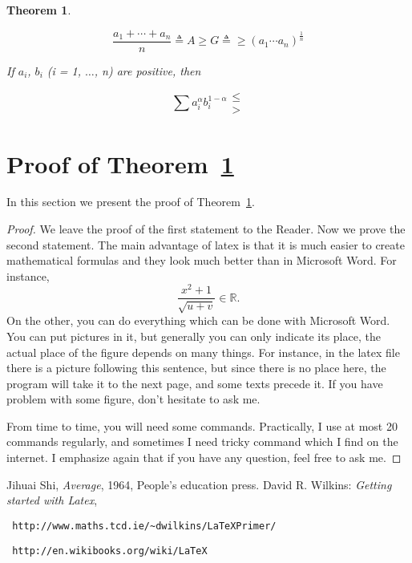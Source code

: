 \documentclass[12pt,a4paper,reqno]{amsart}
\theoremstyle{plain}
\newtheorem{Th}{Theorem}
\theoremstyle{definition}
\begin{document}
\begin{Th} \label{main} 

\begin{equation}
  \frac{a_1 + \cdots +a_n}{n} \triangleq A \geqslant G \triangleq \geqslant (a_1 \cdots a_n)^{\frac{1}{n}}
\end{equation}

If $a_i$, $b_i$  (i = 1, $\ldots$, n) are positive, then

\[
\sum a^{\alpha}_{i} b^{1-\alpha}_{i} 
                \begin{array}{ll}
                  \leqslant  \\
                  > 
                \end{array}
\]


\end{Th}

\section{Proof of Theorem~\ref{main}}

In this section we present the proof of Theorem~\ref{main}.

\begin{proof} We leave the proof of the first statement to the Reader. Now we prove the second statement. The main advantage of latex is that it is much easier to create mathematical formulas and they look much better than in Microsoft Word.
For instance,
$$\frac{x^2+1}{\sqrt{u+v}}\in \mathbb{R}.$$
On the other, you can do everything which can be done with Microsoft Word. You can put pictures in it, but generally you can only indicate its place, the actual place of the figure depends on many things. For instance, in the latex file there is a picture following this sentence, but since there is no place here, the program will take it to the next page, and some texts precede it. If you have problem with some figure, don't hesitate to ask me.

\begin{figure}[h!]
\end{figure}

From time to time, you will need some commands. Practically, I use at most 20 commands regularly, and sometimes I need tricky command which I find on the internet. I emphasize again that if you have any question, feel free to ask me.

\end{proof}

\begin{thebibliography}{99} 

 Jihuai Shi, \textit{Average}, 1964, People's education press.  
 David R. Wilkins: \textit{Getting started with Latex}, \begin{verbatim} http://www.maths.tcd.ie/~dwilkins/LaTeXPrimer/
\end{verbatim}

 \begin{verbatim} http://en.wikibooks.org/wiki/LaTeX \end{verbatim}



\end{thebibliography}
\end{document}
